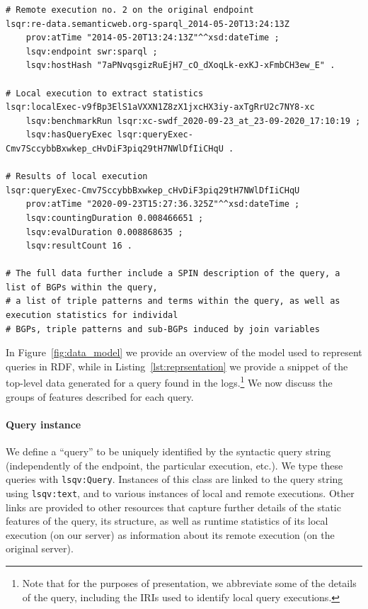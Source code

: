 \begin{lstlisting}
# Remote execution no. 2 on the original endpoint
lsqr:re-data.semanticweb.org-sparql_2014-05-20T13:24:13Z	
	prov:atTime "2014-05-20T13:24:13Z"^^xsd:dateTime ;
	lsqv:endpoint swr:sparql ;
	lsqv:hostHash "7aPNvqsgizRuEjH7_cO_dXoqLk-exKJ-xFmbCH3ew_E" .

# Local execution to extract statistics
lsqr:localExec-v9fBp3ElS1aVXXN1Z8zX1jxcHX3iy-axTgRrU2c7NY8-xc	
	lsqv:benchmarkRun lsqr:xc-swdf_2020-09-23_at_23-09-2020_17:10:19 ;
	lsqv:hasQueryExec lsqr:queryExec-Cmv7SccybbBxwkep_cHvDiF3piq29tH7NWlDfIiCHqU .

# Results of local execution
lsqr:queryExec-Cmv7SccybbBxwkep_cHvDiF3piq29tH7NWlDfIiCHqU	
	prov:atTime "2020-09-23T15:27:36.325Z"^^xsd:dateTime ;
	lsqv:countingDuration 0.008466651 ;
	lsqv:evalDuration 0.008868635 ;
	lsqv:resultCount 16 .
		
# The full data further include a SPIN description of the query, a list of BGPs within the query,
# a list of triple patterns and terms within the query, as well as execution statistics for individal
# BGPs, triple patterns and sub-BGPs induced by join variables
\end{lstlisting}

In Figure~\ref{fig:data_model} we provide an overview of the model used to represent queries in RDF, while in Listing~\ref{lst:reprsentation} we provide a snippet of the top-level data generated for a query found in the \swdf logs.\footnote{Note that for the purposes of presentation, we abbreviate some of the details of the query, including the IRIs used to identify local query executions.} We now discuss the groups of features described for each query.

\paragraph{Query instance} We define a ``query'' to be uniquely identified by the syntactic query string (independently of the endpoint, the particular execution, etc.). We type these queries with \texttt{lsqv:Query}. Instances of this class are linked to the query string using \texttt{lsqv:text}, and to various instances of local and remote executions. Other links are provided to other resources that capture further details of the static features of the query, its structure, as well as runtime statistics of its local execution (on our server) as information about its remote execution (on the original server).

